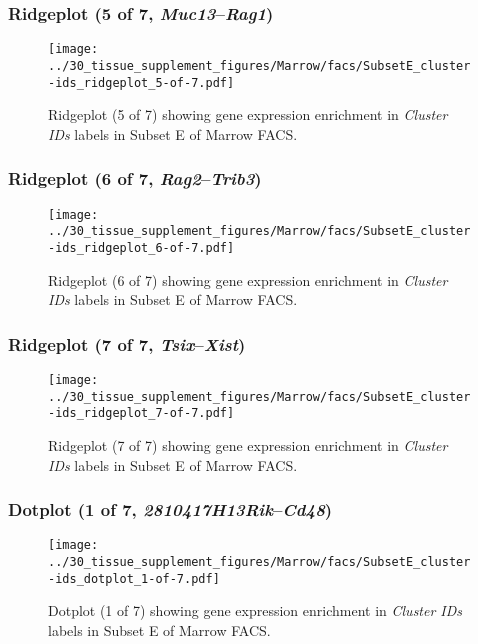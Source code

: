 \clearpage

\subsubsection{Ridgeplot (5 of 7, \emph{Muc13}--\emph{Rag1})}
\begin{figure}[h]
\centering
\texttt{[image: ../30\_tissue\_supplement\_figures/Marrow/facs/SubsetE\_cluster-ids\_ridgeplot\_5-of-7.pdf]}

\caption{ Ridgeplot (5 of 7)  showing gene expression enrichment in \emph{Cluster IDs} labels in Subset E of Marrow FACS. }
\end{figure}


\clearpage

\subsubsection{Ridgeplot (6 of 7, \emph{Rag2}--\emph{Trib3})}
\begin{figure}[h]
\centering
\texttt{[image: ../30\_tissue\_supplement\_figures/Marrow/facs/SubsetE\_cluster-ids\_ridgeplot\_6-of-7.pdf]}

\caption{ Ridgeplot (6 of 7)  showing gene expression enrichment in \emph{Cluster IDs} labels in Subset E of Marrow FACS. }
\end{figure}


\clearpage

\subsubsection{Ridgeplot (7 of 7, \emph{Tsix}--\emph{Xist})}
\begin{figure}[h]
\centering
\texttt{[image: ../30\_tissue\_supplement\_figures/Marrow/facs/SubsetE\_cluster-ids\_ridgeplot\_7-of-7.pdf]}

\caption{ Ridgeplot (7 of 7)  showing gene expression enrichment in \emph{Cluster IDs} labels in Subset E of Marrow FACS. }
\end{figure}


\clearpage

\subsubsection{Dotplot (1 of 7, \emph{2810417H13Rik}--\emph{Cd48})}
\begin{figure}[h]
\centering
\texttt{[image: ../30\_tissue\_supplement\_figures/Marrow/facs/SubsetE\_cluster-ids\_dotplot\_1-of-7.pdf]}

\caption{ Dotplot (1 of 7)  showing gene expression enrichment in \emph{Cluster IDs} labels in Subset E of Marrow FACS. }
\end{figure}


